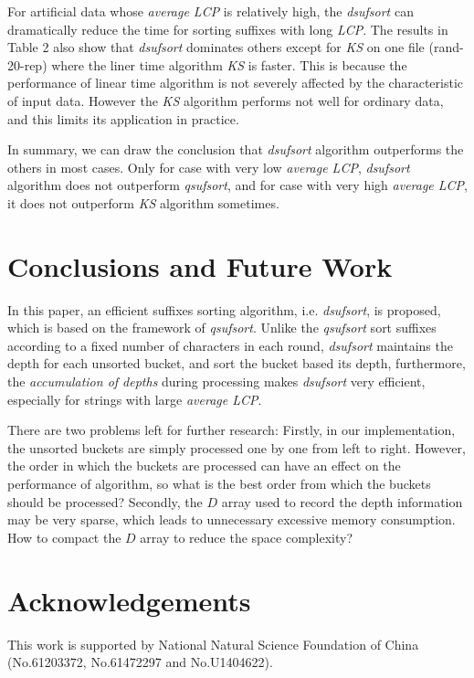 \documentclass{ws-ijprai}
\begin{document}
For artificial data whose \emph{average LCP} is relatively high, the
\emph{dsufsort} can dramatically reduce the time for sorting suffixes
with long \emph{LCP}. The results in Table 2 also show that
\emph{dsufsort} dominates others except for \emph{KS} on one file
(rand-20-rep) where the liner time algorithm \emph{KS} is faster. This
is because the performance of linear time algorithm is not severely
affected by the characteristic of input data.  However the \emph{KS}
algorithm performs not well for ordinary data, and this limits its
application in practice.

In summary, we can draw the conclusion that \emph{dsufsort}
algorithm outperforms the others in most cases. Only for case with
very low \emph{average LCP}, \emph{dsufsort} algorithm does not
outperform \emph{qsufsort}, and for case with very high
\emph{average LCP}, it does not outperform \emph{KS} algorithm
sometimes.

\section{Conclusions and Future Work}

In this paper, an efficient suffixes sorting algorithm,
i.e. \emph{dsufsort}, is proposed, which is based on the framework of
\emph{qsufsort}. Unlike the \emph{qsufsort} sort suffixes according to
a fixed number of characters in each round, \emph{dsufsort} maintains
the depth for each unsorted bucket, and sort the bucket based its
depth, furthermore, the \emph{accumulation of depths} during
processing makes \emph{dsufsort} very efficient, especially for
strings with large \emph{average LCP}.

There are two problems left for further research: Firstly, in our
implementation, the unsorted buckets are simply processed one by one
from left to right. However, the order in which the buckets are
processed can have an effect on the performance of algorithm, so what
is the best order from which the buckets should be processed?
Secondly, the $D$ array used to record the depth information may be
very sparse, which leads to unnecessary excessive memory
consumption. How to compact the $D$ array to reduce the space
complexity?

\section*{Acknowledgements}

This work is supported by National Natural Science Foundation of China
(No.61203372, No.61472297 and No.U1404622).
\end{document}
